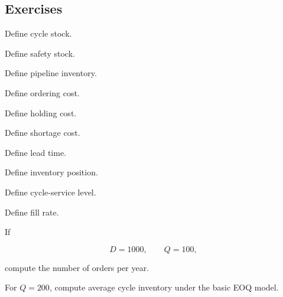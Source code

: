 \subsection{Exercises}
\label{subsec:inventory-exercises}

\begin{exercise}[1]
Define cycle stock.
\end{exercise}

\begin{exercise}[1]
Define safety stock.
\end{exercise}

\begin{exercise}[1]
Define pipeline inventory.
\end{exercise}

\begin{exercise}[1]
Define ordering cost.
\end{exercise}

\begin{exercise}[1]
Define holding cost.
\end{exercise}

\begin{exercise}[1]
Define shortage cost.
\end{exercise}

\begin{exercise}[1]
Define lead time.
\end{exercise}

\begin{exercise}[1]
Define inventory position.
\end{exercise}

\begin{exercise}[1]
Define cycle-service level.
\end{exercise}

\begin{exercise}[1]
Define fill rate.
\end{exercise}

\begin{exercise}[2]
If

\[
D=1000,
\qquad
Q=100,
\]

compute the number of orders per year.
\end{exercise}

\begin{exercise}[2]
For \(Q=200\), compute average cycle inventory under the basic EOQ model.
\end{exercise}

